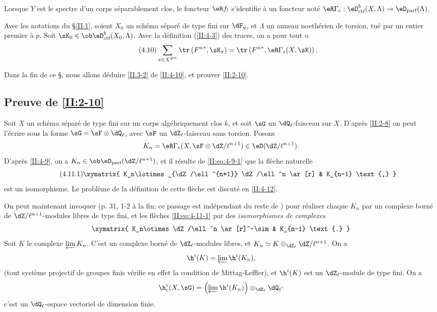 Lorsque $Y$ est le spectre d'un corps séparablement clos, le foncteur $\eR f_!$ 
s'identifie à un foncteur noté 
$\eR \Gamma_c : \eD_\text{ctf}^b(X,\Lambda)\to\eD_\text{parf}(\Lambda)$. 





\begin{theorem_}\label{II:4-10}
Avec les notations du \S\ref{II:1}, soient $X_0$ un schéma séparé de type 
fini sur $\dF_q$, et $\Lambda$ un anneau noethérien de torsion, tué par un 
entier premier à $p$. Soit $\sK_0\in\ob\eD_\textnormal{ctf}^b(X_0,\Lambda)$. 
Avec la définition (\ref{II:4-3}) des traces, on a pour tout $n$ 
\begin{equation*}\tag{4.10}\label{II:eq:4-10}
  \sum_{x\in X^{F^n}} \tr\left({F^n}^*,\sK_x\right) = \tr\left({F^n}^*,\eR\Gamma_c(X,\sK)\right) \text{.}
\end{equation*}
\end{theorem_}

Dans la fin de ce \S, nous allons déduire \ref{II:3-2} de \ref{II:4-10}, et 
prouver \ref{II:2-10}. 





\subsection{Preuve de \texorpdfstring{\ref{II:2-10}}{2.10}}\label{II:4-11}

Soit $X$ un schéma séparé de type fini sur un corps algébriquement clos 
$k$, et soit $\sG$ un $\dQ_\ell$-faisceau sur $X$. D'après \ref{II:2-8} on 
peut l'écrire sous la forme $\sG=\sF\otimes\dQ_\ell$, avec $\sF$ un 
$\dZ_\ell$-faisceau sans torsion. Posons 
\[
  K_n = \eR \Gamma_c(X,\sF\otimes\dZ/\ell^{n+1})\in\eD(\dZ/\ell^{n+1}) \text{.}
\]
D'après \ref{II:4-9}, on a $K_n\in\ob\eD_\text{parf}(\dZ/\ell^{n+1})$, et il 
résulte de \eqref{II:eq:4-9-1} que la flèche naturelle 
\begin{equation*}\tag{4.11.1}\label{II:eq:4-11-1}
\xymatrix{
  K_n\lotimes_{\dZ/\ell^{n+1}} \dZ/\ell^n \ar[r] & K_{n-1} \text{,}
}
\end{equation*}
est un isomorphisme. Le problème de la définition de cette flèche est 
discuté en \ref{II:4-12}. 

On peut maintenant invoquer \cite[XV.3.3]{sga5} (p. 31, 1-2 à la fin; ce 
passage est indépendant du reste de \cite{sga5}) pour réaliser chaque 
$K_n$ par un complexe borné de $\dZ/\ell^{n+1}$-modules libres de type fini, 
et les flèches \eqref{II:eq:4-11-1} par des \emph{isomorphismes de complexes} 
\[\xymatrix{
  K_n\otimes \dZ/\ell^n \ar[r]^-\sim 
    & K_{n-1} \text{.}
}\]
Soit $K$ le complexe $\varprojlim K_n$. C'est un complexe borné de 
$\dZ_\ell$-modules libres, et $K_n\simeq K\otimes_{\dZ_\ell}\dZ/\ell^{n+1}$. On 
a 
\[
  \h^i(K) = \varprojlim \h^i(K_n) \text{,}
\]
(tout système projectif de groupes finis vérifie en effet la condition de 
Mittag-Leffler), et $\h^i(K)$ est un $\dZ_\ell$-module de type fini. On a 
\[
  \h_c^i(X,\sG) = \left(\varprojlim \h^i(K_n) \right)\otimes_{\dZ_\ell} \dQ_\ell \text{:}
\]
c'est un $\dQ_\ell$-espace vectoriel de dimension finie. 





